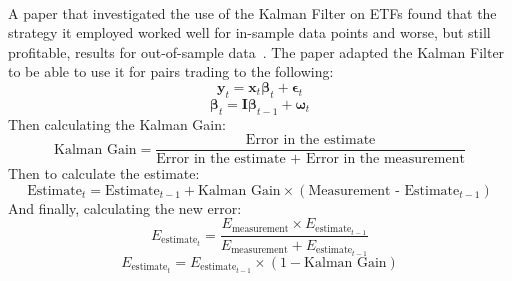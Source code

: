 \\[3mm]
A paper that investigated the use of the Kalman Filter on ETFs found that the strategy it employed worked well for in-sample data points and worse, but still profitable, results for out-of-sample data~\cite{dempsey_market_2017}. The paper adapted the Kalman Filter to be able to use it for pairs trading to the following: $$\mathbf{y}_t = \mathbf{x}_t \mathbf{\beta}_t + \mathbf{\epsilon}_t$$ $$\mathbf{\beta}_t = \mathbf{I} \mathbf{\beta}_{t-1} + \mathbf{\omega}_t$$ Then calculating the Kalman Gain: $$\text{Kalman Gain} = \frac{\text{Error in the estimate}}{\text{Error in the estimate + Error in the measurement}}$$ Then to calculate the estimate: $$\text{Estimate}_t = \text{Estimate}_{t-1} + \text{Kalman Gain} \times (\text{Measurement - }\text{Estimate}_{t-1})$$ And finally, calculating the new error: $$E_{\text{estimate}_t} = \frac{E_{\text{measurement}} \times E_{\text{estimate}_{t-1}}}{E_{\text{measurement}} + E_{\text{estimate}_{t-1}}}$$ $$E_{\text{estimate}_t} = E_{\text{estimate}_{t-1}} \times (1 - \text{Kalman Gain})$$

